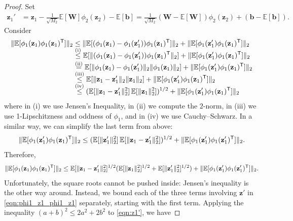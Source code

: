 \documentclass[twoside]{article}
\newcommand{\vb}{\mathbf{b}}
\newcommand{\vz}{\mathbf{z}}
\newcommand{\mW}{\mathbf{W}}
\newcommand{\E}{\mathbb{E}}
\newcommand{\T}{\text{\textsf{T}}}
\DeclarePairedDelimiter\norm{\|}{\|}             %
\theoremstyle{theoremstyle}
\begin{document}
\begin{proof}
    Set
    \begin{align}
        \vz_1' &= \vz_1 - \tfrac1{\sqrt{M_2}}\E[\mW] \phi_2(\vz_2) - \E[\vb] = \tfrac1{\sqrt{M_2}}(\mW - \E[\mW])\phi_2(\vz_2) + (\vb - \E[\vb]). \label{eqn:z1'}
    \end{align}
    Consider
    \begin{align}
        \norm{\E[\phi_1(\vz_1) \phi_1(\vz_1)^\T]}_2
        &\le \norm{\E[(\phi_1(\vz_1) - \phi_1(\vz'_1)) \phi_1(\vz_1)^\T]}_2
        + \norm{\E[\phi_1(\vz'_1) \phi_1(\vz_1)^\T]}_2 \\
        &\overset{\smash{\text{(i)}}}{\le} \E[\norm{(\phi_1(\vz_1) - \phi_1(\vz'_1)) \phi_1(\vz_1)^\T}_2]
        + \norm{\E[\phi_1(\vz'_1) \phi_1(\vz_1)^\T]}_2 \\
        &\overset{\smash{\text{(ii)}}}{=} \E[\norm{\phi_1(\vz_1) - \phi_1(\vz'_1)}_2 \norm{\phi_1(\vz_1)}_2]
        + \norm{\E[\phi_1(\vz'_1) \phi_1(\vz_1)^\T]}_2 \\
        &\overset{\smash{\text{(iii)}}}{\le} \E[\norm{\vz_1 - \vz'_1}_2 \norm{\vz_1}_2] 
        + \norm{\E[\phi_1(\vz'_1) \phi_1(\vz_1)^\T]}_2 \\
        &\overset{\smash{\text{(iv)}}}{\le} (\E[\norm{\vz_1 - \vz'_1}^2_2] \,\E[\norm{\vz_1}^2_2])^{1/2}
        + \norm{\E[\phi_1(\vz'_1) \phi_1(\vz_1)^\T]}_2
    \end{align}
    where in (i) we use Jensen's Inequality, in (ii) we compute the $2$-norm, in (iii) we use 1-Lipschitzness and oddness of $\phi_1$, and in (iv) we use Cauchy--Schwarz.
    In a similar way, we can simplify the last term from above:%
    \begin{equation}
        \norm{\E[\phi_1(\vz'_1) \phi_1(\vz_1)^\T]}_2
        \le (\E[\norm{\vz'_1}^2_2]\,\E[\norm{\vz_1 - \vz'_1}^2_2])^{1/2} + \norm{\E[\phi_1(\vz'_1) \phi_1(\vz'_1)^\T]}_2.
    \end{equation}
    Therefore,
    \begin{align}
        \norm{\E[\phi_1(\vz_1) \phi_1(\vz_1)^\T]}_2 
        \le
            \E[\norm{\vz_1 - \vz'_1}^2_2]^{1/2}
            (\E[\norm{\vz_1}^2_2]^{1/2} + \E[\norm{\vz'_1}^2_2]^{1/2})
            + \norm{\E[\phi_1(\vz'_1) \phi_1(\vz'_1)^\T]}_2.\label{eqn:phi1_z1_phi1_z1}
    \end{align}
    Unfortunately, the square roots cannot be pushed inside: Jensen's inequality is the other way around. Instead, we bound each of the three terms involving $\vz'$ in \cref{eqn:phi1_z1_phi1_z1} separately, starting with the first term. Applying the inequality $(a + b)^2 \le 2a^2 + 2b^2$ to \cref{eqn:z1'}, we have

\end{proof}
\end{document}
